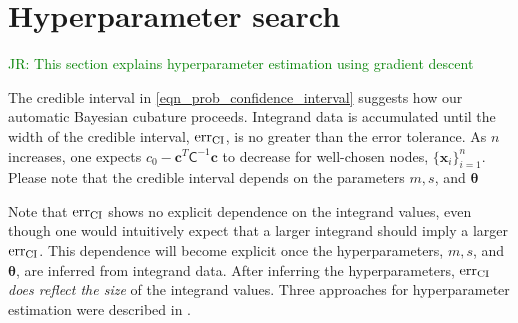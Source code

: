 \documentclass{svjour3}                     %
\newcommand{\bm}[1]{\boldsymbol{#1}}
\newcommand{\vtheta}{{\bm{\theta}}}
\newcommand{\vc}{\bm{c}}
\newcommand{\vx}{\bm{x}}
\newcommand{\mC}{\mathsf{C}}
\newcommand{\CI}{\textup{CI}}
\newcommand{\err}{\textup{err}}
\newcommand{\JRNote}[1]{{\textcolor{green}{JR: #1}}}
\begin{document}
\section{Hyperparameter search}
\JRNote{
This section explains hyperparameter estimation using gradient descent}


The credible interval in \eqref{eqn_prob_confidence_interval} suggests how our automatic Bayesian cubature proceeds.  Integrand data is accumulated until the width of the credible interval, $\err_{\CI}$, is no greater than the error tolerance.  As $n$ increases, one expects $c_{0} - \vc^T\mC^{-1}\vc$ to decrease for well-chosen nodes, $\{\vx_i\}_{i=1}^n$. Please note that the credible interval depends on the parameters $m, s$, and $\vtheta$

Note that $\err_{\CI}$ shows no explicit dependence on the integrand values, even though one would intuitively expect that a larger integrand should imply a larger $\err_{\CI}$. This dependence will become explicit once the hyperparameters, $m, s$, and $\vtheta$,  are inferred from integrand data.
After inferring the hyperparameters, $\err_{\CI}$ \emph{does reflect the size} of the integrand values. 
Three approaches for hyperparameter estimation were described in \cite{JagHic19a}. 
\end{document}
